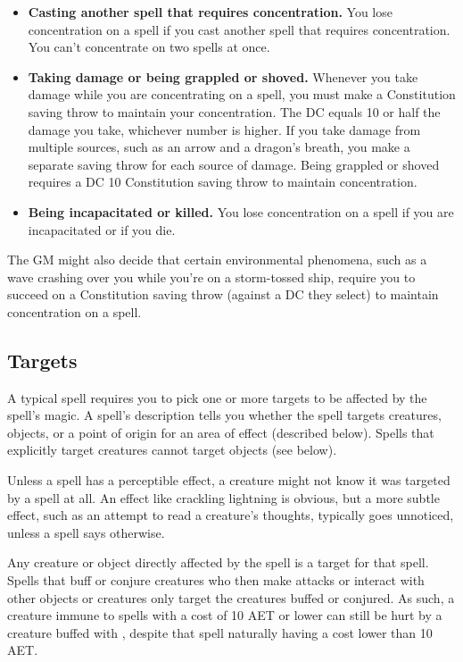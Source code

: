\begin{itemize}
    \item \textbf{Casting another spell that requires concentration.} You lose concentration on a spell if you cast another spell that requires concentration. You can't concentrate on two spells at once.
    \item \textbf{Taking damage or being grappled or shoved.} Whenever you take damage while you are concentrating on a spell, you must make a Constitution saving throw to maintain your concentration. The DC equals 10 or half the damage you take, whichever number is higher. If you take damage from multiple sources, such as an arrow and a dragon's breath, you make a separate saving throw for each source of damage. Being grappled or shoved requires a DC 10 Constitution saving throw to maintain concentration.
    \item \textbf{Being incapacitated or killed.} You lose concentration on a spell if you are incapacitated or if you die. 
\end{itemize}

The GM might also decide that certain environmental phenomena, such as a wave crashing over you while you're on a storm-tossed ship, require you to succeed on a Constitution saving throw (against a DC they select) to maintain concentration on a spell.

\subsection{Targets}

A typical spell requires you to pick one or more targets to be affected by the spell's magic. A spell's description tells you whether the spell targets creatures, objects, or a point of origin for an area of effect (described below). Spells that explicitly target creatures cannot target objects (see  below).

Unless a spell has a perceptible effect, a creature might not know it was targeted by a spell at all. An effect like crackling lightning is obvious, but a more subtle effect, such as an attempt to read a creature's thoughts, typically goes unnoticed, unless a spell says otherwise.

Any creature or object directly affected by the spell is a target for that spell. Spells that buff or conjure creatures who then make attacks or interact with other objects or creatures only target the creatures buffed or conjured. As such, a creature immune to spells with a cost of 10 AET or lower can still be hurt by a creature buffed with , despite that spell naturally having a cost lower than 10 AET.

